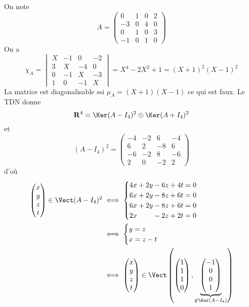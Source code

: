 On note \[
    A= \begin{pmatrix}
        0 & 1 & 0 & 2 \\ 
        -3 & 0 & 4 & 0\\
        0 & 1 & 0 & 3\\
        -1 & 0 & 1 & 0
    \end{pmatrix}
\]
On a \[
    \chi_A= \begin{vmatrix}
        X & -1 & 0 & -2 \\ 
        3 & X & -4 & 0\\
        0 & -1 & X & -3\\
        1 & 0 & -1 & X
    \end{vmatrix}= X^4-2X^2+1=(X+1)^2(X-1)^2
\]
La matrice est diagonalisable ssi $\mu_A=(X+1)(X-1)$ ce qui est faux. Le TDN donne \[
    \R^4=\Ker(A-I_4)^2\oplus \Ker(A+I_4)^2
\]
et \[
    (A-I_4)^2= 
    \begin{pmatrix}-4&-2&6&-4\\6&2&-8&6\\-6&-2&8&-6\\2&0&-2&2\end{pmatrix}
\]
d'où \begin{align*}
    \begin{pmatrix}
        x\\y\\z\\t
    \end{pmatrix} \in \Vect(A-I_4)^2 &\iff \begin{cases}
        4x+2y-6z+4t=0 \\
        6x+2y-8z+6t=0 \\
        6x+2y-8z+6t=0 \\
        2x\phantom{+2y\;\,}-2z+2t=0
    \end{cases} \\
    &\iff \begin{cases}
        y=z \\
        x=z-t
    \end{cases}\\
    & \iff
    \begin{pmatrix}
        x\\y\\z\\t
    \end{pmatrix}\in\Vect \left( \begin{pmatrix}
        1\\1\\1\\0
        \end{pmatrix}, \underbrace{\begin{pmatrix}
        -1\\0\\0\\1
    \end{pmatrix}}_{\not\in\Ker(A-I_4)} \right)
\end{align*}

